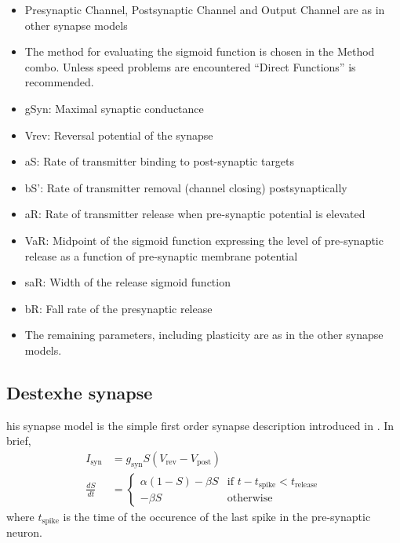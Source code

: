 \documentclass{article}
\begin{document}
\parbox[b]{0.5\textwidth}{
\begin{itemize}
\item Presynaptic Channel, Postsynaptic Channel and Output Channel are
  as in other synapse models
\item The method for evaluating the sigmoid function is chosen in the
  Method combo. Unless speed problems are encountered ``Direct
  Functions'' is recommended.
\item gSyn: Maximal synaptic conductance
\item Vrev: Reversal potential of the synapse
\item aS: Rate of transmitter binding to post-synaptic targets
\item bS': Rate of transmitter removal (channel closing)
  postsynaptically
\item aR: Rate of transmitter release when pre-synaptic potential is
  elevated
\end{itemize}
}
\begin{itemize}
\item VaR: Midpoint of the sigmoid function expressing the level of
  pre-synaptic release as a function of pre-synaptic membrane
  potential
\item saR: Width of the release sigmoid function
\item bR: Fall rate of the presynaptic release
\item The remaining parameters, including plasticity are as in the
  other synapse models.
\end{itemize}


\subsection{Destexhe synapse}
his synapse model is the simple first order synapse description
introduced in \cite{Destexhe1994}. In brief,
\begin{align}
I_{\text{syn}}&= g_{\text{syn}} S (V_{\text{rev}} -
V_{\text{post}}) \\
\frac{dS}{dt} &= \left\{ \begin{array}{ll} 
  \alpha (1-S) - \beta S & \text{if } t-t_{\text{spike}} < t_{\text{release}} \\
- \beta S & \text{otherwise} 
\end{array} \right.
\end{align}
where $t_{\text{spike}}$ is the time of the occurence of the last
spike in the pre-synaptic neuron.
\end{document}
